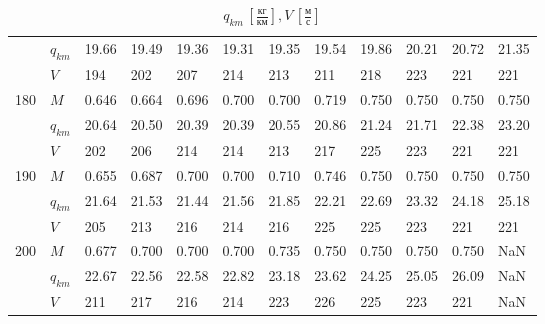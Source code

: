 \documentclass[bachelor,subf,14pt, substylefile = spbu.rtx]{disser}
\begin{document}
\begin{table}
{\begin{tabular}{|l|l|llllllllll|}
& $q_{km}$ &  19.66  &                   19.49  &                   19.36  &  19.31 \cellcolor{green} &                   19.35  &                   19.54  &                   19.86  &                   20.21  &  20.72  &  21.35  \\
& $V$ &    194  &                     202  &                     207  &    214 \cellcolor{green} &                     213  &                     211  &                     218  &                     223  &    221  &    221  \\
\hline
180 & $M$ &  0.646  &                   0.664  &  0.696 \cellcolor{green} &                   0.700  &                   0.700  &                   0.719  &                   0.750  &                   0.750  &  0.750  &  0.750  \\
& $q_{km}$ &  20.64  &                   20.50  &  20.39 \cellcolor{green} &                   20.39  &                   20.55  &                   20.86  &                   21.24  &                   21.71  &  22.38  &  23.20  \\
& $V$ &    202  &                     206  &    214 \cellcolor{green} &                     214  &                     213  &                     217  &                     225  &                     223  &    221  &    221  \\
\hline
190 & $M$ &  0.655  &                   0.687  &  0.700 \cellcolor{green} &                   0.700  &                   0.710  &                   0.746  &                   0.750  &                   0.750  &  0.750  &  0.750  \\
& $q_{km}$ &  21.64  &                   21.53  &  21.44 \cellcolor{green} &                   21.56  &                   21.85  &                   22.21  &                   22.69  &                   23.32  &  24.18  &  25.18  \\
& $V$ &    205  &                     213  &    216 \cellcolor{green} &                     214  &                     216  &                     225  &                     225  &                     223  &    221  &    221  \\
\hline
200 & $M$ &  0.677  &  0.700 \cellcolor{green} &                   0.700  &                   0.700  &                   0.735  &                   0.750  &                   0.750  &                   0.750  &  0.750  &     NaN \\
& $q_{km}$ &  22.67  &  22.56 \cellcolor{green} &                   22.58  &                   22.82  &                   23.18  &                   23.62  &                   24.25  &                   25.05  &  26.09  &     NaN \\
& $V$ &    211  &    217 \cellcolor{green} &                     216  &                     214  &                     223  &                     226  &                     225  &                     223  &    221  &     NaN \\
\hline
\end{tabular}
}
\caption{$q_{km}\, [\frac{кг}{км}], V \, [\frac{м}{с}] $}
\label{t:1}

\end{table}
\end{document}
